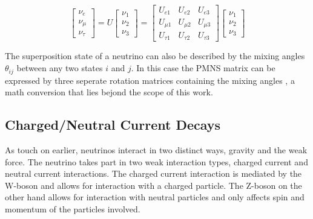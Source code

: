 \documentclass[a4paper,10pt]{scrartcl}
\begin{document}
\begin{equation}
    \begin{bmatrix}
        \nu_{e}   \\
        \nu_{\mu} \\
        \nu_{\tau}
    \end{bmatrix}
    =
    U
    \begin{bmatrix}
        \nu_{1} \\
        \nu_{2} \\
        \nu_{3}
    \end{bmatrix}
    =
    \begin{bmatrix}
        U_{e 1}    & U_{e 2}    & U_{e 3}    \\
        U_{\mu 1}  & U_{\mu 2}  & U_{\mu 3}  \\
        U_{\tau 1} & U_{\tau 2} & U_{\tau 3}
    \end{bmatrix}
    \begin{bmatrix}
        \nu_{1} \\
        \nu_{2} \\
        \nu_{3}
    \end{bmatrix}
\end{equation}

The superposition state of a neutrino can also be described by the mixing angles $\theta_{ij}$ between any two states $i$ and $j$.
In this case the PMNS matrix can be expressed by three seperate rotation matrices containing the mixing angles \cite{warwick}, a math conversion that lies bejond the scope of this work.



\subsection{Charged/Neutral Current Decays}

As touch on earlier, neutrinos interact in two distinct ways, gravity and the weak force.
The neutrino takes part in two weak interaction types, charged current and neutral current interactions.
The charged current interaction is mediated by the W-boson and allows for interaction with a charged particle.
The Z-boson on the other hand allows for interaction with neutral particles and only affects spin and momentum of the particles involved.
\end{document}
